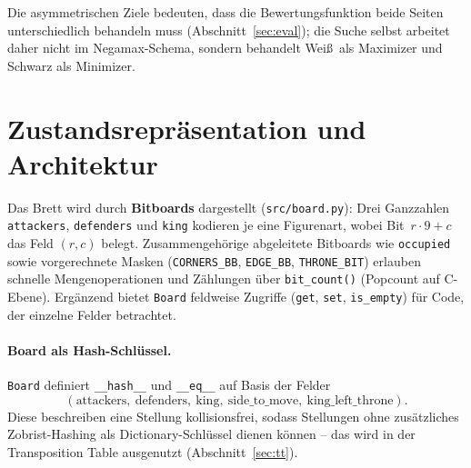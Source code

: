 \documentclass[11pt,a4paper]{article}
\newcommand{\code}[1]{\texttt{\small #1}}
\begin{document}
Die asymmetrischen Ziele bedeuten, dass die Bewertungsfunktion beide Seiten
unterschiedlich behandeln muss (Abschnitt~\ref{sec:eval}); die Suche selbst
arbeitet daher nicht im Negamax-Schema, sondern behandelt Wei\ss\ als
Maximizer und Schwarz als Minimizer.

\section{Zustandsrepr\"asentation und Architektur}\label{sec:arch}
Das Brett wird durch \textbf{Bitboards} dargestellt (\code{src/board.py}):
Drei Ganzzahlen \code{attackers}, \code{defenders} und \code{king} kodieren je
eine Figurenart, wobei Bit~$r\cdot 9 + c$ das Feld $(r,c)$ belegt.
Zusammengeh\"orige abgeleitete Bitboards wie \code{occupied} sowie vorgerechnete
Masken (\code{CORNERS\_BB}, \code{EDGE\_BB}, \code{THRONE\_BIT}) erlauben schnelle
Mengenoperationen und Z\"ahlungen \"uber \code{bit\_count()} (Popcount auf
C-Ebene).
Erg\"anzend bietet \code{Board} feldweise Zugriffe (\code{get}, \code{set},
\code{is\_empty}) f\"ur Code, der einzelne Felder betrachtet.

\paragraph{Board als Hash-Schl\"ussel.}
\code{Board} definiert \code{\_\_hash\_\_} und \code{\_\_eq\_\_} auf Basis der Felder
\[
(\text{attackers},\ \text{defenders},\ \text{king},\ \text{side\_to\_move},\ \text{king\_left\_throne}).
\]
Diese beschreiben eine Stellung kollisionsfrei, sodass Stellungen ohne
zus\"atzliches Zobrist-Hashing als Dictionary-Schl\"ussel dienen k\"onnen -- das
wird in der Transposition Table ausgenutzt (Abschnitt~\ref{sec:tt}).
\end{document}
